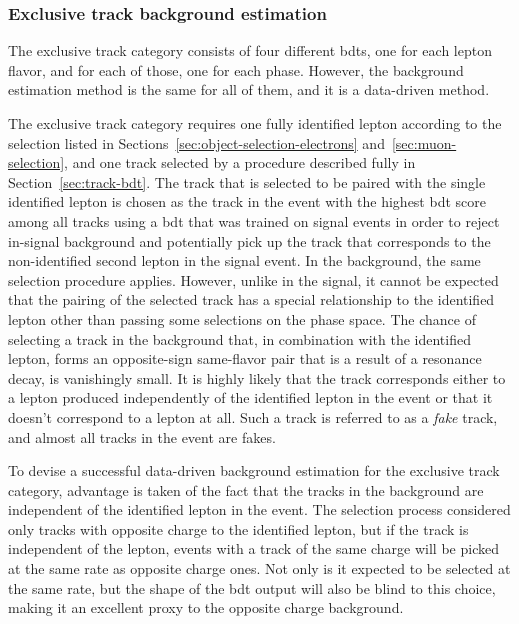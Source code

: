 \clearpage
\subsubsection{Exclusive track background estimation}
\label{sec:ex-track-background-estimation}

The exclusive track category consists of four different \glspl{bdt}, one for each lepton flavor, and for each of those, one for each phase. However, the background estimation method is the same for all of them, and it is a data-driven method.

The exclusive track category requires one fully identified lepton according to the selection listed in Sections~\ref{sec:object-selection-electrons} and~\ref{sec:muon-selection}, and one track selected by a procedure described fully in Section~\ref{sec:track-bdt}. The track that is selected to be paired with the single identified lepton is chosen as the track in the event with the highest \gls{bdt} score among all tracks using a \gls{bdt} that was trained on signal events in order to reject in-signal background and potentially pick up the track that corresponds to the non-identified second lepton in the signal event. In the background, the same selection procedure applies. However, unlike in the signal, it cannot be expected that the pairing of the selected track has a special relationship to the identified lepton other than passing some selections on the phase space. The chance of selecting a track in the background that, in combination with the identified lepton, forms an opposite-sign same-flavor pair that is a result of a resonance decay, is vanishingly small. It is highly likely that the track corresponds either to a lepton produced independently of the identified lepton in the event or that it doesn't correspond to a lepton at all. Such a track is referred to as a \emph{fake} track, and almost all tracks in the event are fakes.

To devise a successful data-driven background estimation for the exclusive track category, advantage is taken of the fact that the tracks in the background are independent of the identified lepton in the event. The selection process considered only tracks with opposite charge to the identified lepton, but if the track is independent of the lepton, events with a track of the same charge will be picked at the same rate as opposite charge ones. Not only is it expected to be selected at the same rate, but the shape of the \gls{bdt} output will also be blind to this choice, making it an excellent proxy to the opposite charge background.

